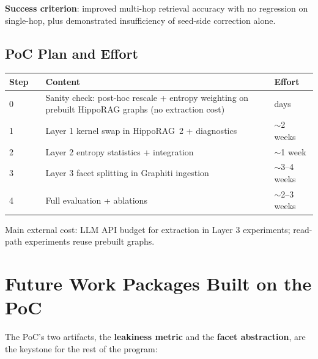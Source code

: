 \documentclass[11pt,a4paper]{article}
\begin{document}
\textbf{Success criterion}: improved multi-hop retrieval accuracy with no regression on single-hop, plus demonstrated insufficiency of seed-side correction alone.

\subsection{PoC Plan and Effort}

\begin{center}
\begin{tabular}{llp{7cm}l}
\toprule
Step & & Content & Effort\\
\midrule
0 & & Sanity check: post-hoc rescale + entropy weighting on prebuilt HippoRAG graphs (no extraction cost) & days\\
1 & & Layer 1 kernel swap in HippoRAG~2 + diagnostics & $\sim$2 weeks\\
2 & & Layer 2 entropy statistics + integration & $\sim$1 week\\
3 & & Layer 3 facet splitting in Graphiti ingestion & $\sim$3--4 weeks\\
4 & & Full evaluation + ablations & $\sim$2--3 weeks\\
\bottomrule
\end{tabular}
\end{center}

Main external cost: LLM API budget for extraction in Layer 3 experiments; read-path experiments reuse prebuilt graphs.

\section{Future Work Packages Built on the PoC}

The PoC's two artifacts, the \textbf{leakiness metric} and the \textbf{facet abstraction}, are the keystone for the rest of the program:
\end{document}
